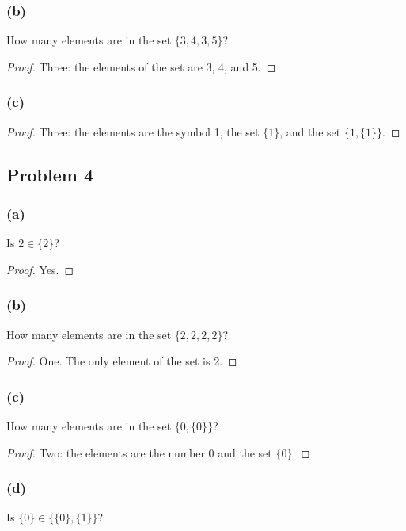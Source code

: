 \documentclass[14pt]{extarticle}
\begin{document}
\subsubsection{(b)}
How many elements are in the set $\{3, 4, 3, 5\}$?

\begin{proof}
    Three: the elements of the set are 3, 4, and 5.
\end{proof}

\subsubsection{(c)}

\begin{proof}
    Three: the elements are the symbol 1, the set $\{1\}$, and the set
    $\{1, \{1\}\}$.
\end{proof}


\subsection{Problem 4}

\subsubsection{(a)}
Is $2 \in \{2\}$?

\begin{proof}
    Yes.
\end{proof}

\subsubsection{(b)}
How many elements are in the set $\{2, 2, 2, 2\}$?

\begin{proof}
    One. The only element of the set is 2.
\end{proof}

\subsubsection{(c)}
How many elements are in the set $\{0, \{0\}\}$?

\begin{proof}
    Two: the elements are the number 0 and the set $\{0\}$.
\end{proof}

\subsubsection{(d)}
Is $\{0\} \in \{\{0\}, \{1\}\}$?
\end{document}
